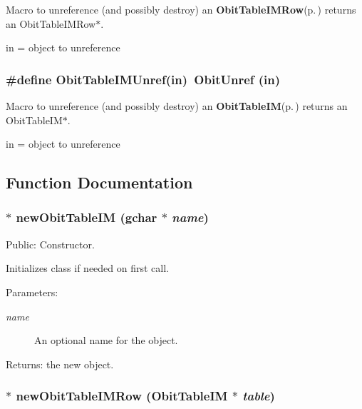 Macro to unreference (and possibly destroy) an {\bf Obit\-Table\-IMRow}{\rm (p.\,\pageref{structObitTableIMRow})} returns an Obit\-Table\-IMRow$\ast$. 

in = object to unreference 
\subsubsection{\setlength{\rightskip}{0pt plus 5cm}\#define Obit\-Table\-IMUnref(in)\ Obit\-Unref (in)}\label{ObitTableIM_8h_a1}


Macro to unreference (and possibly destroy) an {\bf Obit\-Table\-IM}{\rm (p.\,\pageref{structObitTableIM})} returns an Obit\-Table\-IM$\ast$. 

in = object to unreference 

\subsection{Function Documentation}
\subsubsection{$\ast$ new\-Obit\-Table\-IM (gchar $\ast$ {\em name})}\label{ObitTableIM_8h_a11}


Public: Constructor. 

Initializes class if needed on first call. \begin{Desc}
\item[Parameters:]
\begin{description}
\item[{\em name}]An optional name for the object. \end{description}
\end{Desc}
\begin{Desc}
\item[Returns:]the new object. \end{Desc}
\subsubsection{$\ast$ new\-Obit\-Table\-IMRow ({\bf Obit\-Table\-IM} $\ast$ {\em table})}\label{ObitTableIM_8h_a8}


